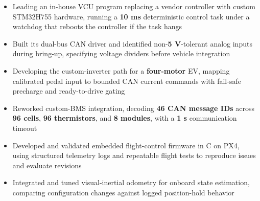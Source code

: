 \documentclass[10pt,letterpaper]{article}
\renewcommand{\entryspace}{\vspace{0pt}}
\begin{document}
\bodyfont

\resumeheader
\educationsection




\orgline{\spartanracing}
\begin{itemize}
  \item Leading an in-house VCU program replacing a vendor controller with custom STM32H755 hardware, running a \textbf{10 ms} deterministic control task under a watchdog that reboots the controller if the task hangs
  \item Built its dual-bus CAN driver and identified non-\textbf{5 V}-tolerant analog inputs during bring-up, specifying voltage dividers before vehicle integration
  \item Developing the custom-inverter path for a \textbf{four-motor} EV, mapping calibrated pedal input to bounded CAN current commands with fail-safe precharge and ready-to-drive gating
  \item Reworked custom-BMS integration, decoding \textbf{46 CAN message IDs} across \textbf{96 cells}, \textbf{96 thermistors}, and \textbf{8 modules}, with a \textbf{1 s} communication timeout
\end{itemize}

\entryspace

\begin{itemize}
  \item Developed and validated embedded flight-control firmware in C on PX4, using structured telemetry logs and repeatable flight tests to reproduce issues and evaluate revisions
  \item Integrated and tuned visual-inertial odometry for onboard state estimation, comparing configuration changes against logged position-hold behavior
\end{itemize}

\entryspace
\end{document}
